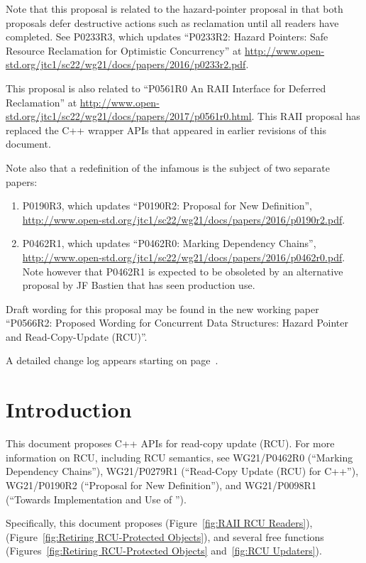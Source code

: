 \documentclass[letterpaper,10pt]{article}
\begin{document}
Note that this proposal is related to the hazard-pointer proposal in
that both proposals defer destructive actions such as reclamation until
all readers have completed.
See P0233R3, which updates ``P0233R2: Hazard Pointers:
Safe Resource Reclamation for Optimistic Concurrency''
at \url{http://www.open-std.org/jtc1/sc22/wg21/docs/papers/2016/p0233r2.pdf}.

This proposal is also related to ``P0561R0 An RAII Interface for Deferred
Reclamation'' at
\url{http://www.open-std.org/jtc1/sc22/wg21/docs/papers/2017/p0561r0.html}.
This RAII proposal has replaced the C++ wrapper APIs that appeared in
earlier revisions of this document.

Note also that a redefinition of the infamous 
is the subject of two separate papers:

\begin{enumerate}
\item	P0190R3, which updates
	``P0190R2: Proposal for New  Definition'',
	\url{http://www.open-std.org/jtc1/sc22/wg21/docs/papers/2016/p0190r2.pdf}.
\item	P0462R1, which updates
	``P0462R0: Marking  Dependency Chains'',
	\url{http://www.open-std.org/jtc1/sc22/wg21/docs/papers/2016/p0462r0.pdf}.
	Note however that P0462R1 is expected to be obsoleted by
	an alternative proposal by JF Bastien that has seen production
	use.
\end{enumerate}

Draft wording for this proposal may be found in the new working paper
``P0566R2: Proposed Wording for Concurrent Data Structures: Hazard
Pointer and Read-Copy-Update (RCU)''.

A detailed change log appears starting on
page~\pageref{sec:Change Log}.

\section{Introduction}
\label{sec:Introduction}

This document proposes C++ APIs for read-copy update (RCU).
For more information on RCU, including RCU semantics, see
WG21/P0462R0 (``Marking  Dependency Chains''),
WG21/P0279R1 (``Read-Copy Update (RCU) for C++''),
WG21/P0190R2 (``Proposal for New  Definition''),
and
WG21/P0098R1 (``Towards Implementation and Use of '').

Specifically, this document proposes
 (Figure~\ref{fig:RAII RCU Readers}),
 (Figure~\ref{fig:Retiring RCU-Protected Objects}), and
several free functions
(Figures~\ref{fig:Retiring RCU-Protected Objects}
and~\ref{fig:RCU Updaters}).
\end{document}
